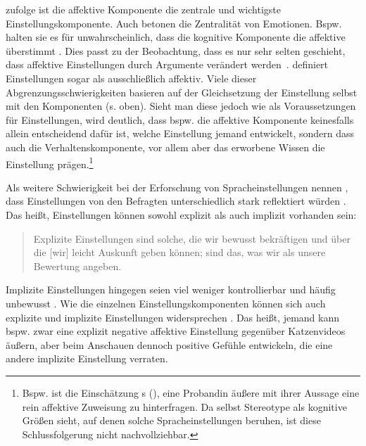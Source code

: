 \citet[78]{Hermanns.2002} zufolge ist die affektive Komponente die zentrale und wichtigste Einstellungskomponente. Auch \citet[222]{Cargile.1994} betonen die Zentralit{\"a}t von Emotionen. Bspw. halten sie es f{\"u}r unwahrscheinlich, dass die kognitive Komponente die affektive {\glqq}{\"u}berstimmt{\grqq} \citep[s.][222]{Cargile.1994}. 
Dies passt zu der Beobachtung, dass es nur sehr selten geschieht, dass affektive Einstellungen durch Argumente ver{\"a}ndert werden~\citep[s.][219]{Aronson.2014}. 
\citet[142]{Riehl.2000} definiert Einstellungen sogar als ausschließlich affektiv. 
Viele dieser Abgrenzungsschwierigkeiten basieren auf der Gleichsetzung der Einstellung selbst mit den Komponenten (s. oben). 
Sieht man diese jedoch wie \citet[]{Jonas.2014} als Voraussetzungen für Einstellungen, wird deutlich, dass bspw. die affektive Komponente keinesfalls allein entscheidend dafür ist, welche Einstellung jemand entwickelt, sondern dass auch die Verhaltenskomponente, vor allem aber das erworbene Wissen die Einstellung prägen.\footnote{Bspw. ist die Einschätzung \citeauthor{Riehl.2000}s (\citeyear[147]{Riehl.2000}), eine Probandin äußere mit ihrer Aussage  eine \glqq rein affektive Zuweisung\grqq{} zu hinterfragen. Da \citet[159]{Riehl.2000} selbst Stereotype als \glqq kognitive Größen\grqq{} sieht, auf denen solche Spracheinstellungen beruhen, ist diese Schlussfolgerung nicht nachvollziehbar.}

Als weitere Schwierigkeit bei der Erforschung von Spracheinstellungen nennen \citet[182]{Plewnia.2011}, dass Einstellungen von den Befragten unterschiedlich stark reflektiert w{\"u}rden \citep[s. auch][143]{Riehl.2000}. 
Das heißt, Einstellungen können sowohl explizit als auch implizit vorhanden sein: 
\begin{quote}Explizite Einstellungen sind solche, die wir bewusst bekr{\"a}ftigen und {\"u}ber die [wir] leicht Auskunft geben k{\"o}nnen; sind das, was wir als unsere Bewertung angeben.~\citep[222]{Aronson.2014}\end{quote}
Implizite Einstellungen hingegen seien viel weniger kontrollierbar und häufig unbewusst \citep[s.][222]{Aronson.2014}. Wie die einzelnen Einstellungskomponenten können sich auch explizite und implizite Einstellungen widersprechen \citep[s.][222]{Aronson.2014}. Das heißt, jemand kann bspw. zwar eine explizit negative affektive Einstellung gegenüber Katzenvideos äußern, aber beim Anschauen dennoch positive Gefühle entwickeln, die eine andere implizite Einstellung verraten.

